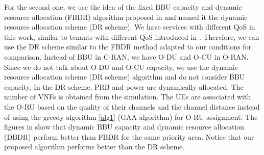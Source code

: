 \documentclass[lettersize,journal]{IEEEtran}
\begin{document}
For the second one, we use the idea of the fixed BBU capacity and dynamic resource allocation (FBDR) algorithm proposed in \cite{lee2018dynamic} and named it the dynamic resource allocation scheme (DR scheme). 
 We have services with different QoS in this work, similar to tenants with different QoS introduced in \cite{lee2018dynamic}. Therefore, we can use the DR scheme similar to the FBDR method adapted to our conditions for comparison. Instead of BBU in C-RAN, we have O-DU and O-CU in O-RAN.
 Since we do not talk about O-DU and O-CU capacity, we use the dynamic resource allocation scheme (DR scheme) algorithm and do not consider BBU capacity.
 In the DR scheme, PRB and power are dynamically allocated. The number of VNFs is obtained from the simulation. The UEs are associated with the O-RU based on the quality of their channels and the channel distance instead of using the greedy algorithm \ref{alg1} (GAA algorithm) for O-RU assignment. The figures in \cite{lee2018dynamic} show that dynamic BBU capacity and dynamic resource allocation (DBDR) perform better than FBDR for the same priority area. Notice that our proposed algorithm performs better than the DR scheme.
\vspace{-3mm}
\end{document}
